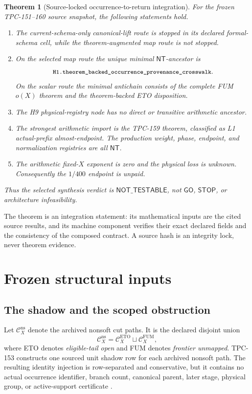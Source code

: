 \documentclass[11pt]{article}
\newtheorem{theorem}{Theorem}[section]
\theoremstyle{definition}
\newcommand{\NT}{\mathsf{NT}}
\newcommand{\code}[1]{\texttt{\small #1}}
\begin{document}
\begin{theorem}[Source-locked occurrence-to-return integration]
\label{thm:integration}
For the frozen TPC-151--160 source snapshot, the following statements
hold.
\begin{enumerate}[label=\textup{(\roman*)},leftmargin=2.2em]
  \item The current-schema-only canonical-lift route is stopped in its
  declared formal-schema cell, while the theorem-augmented map route
  is not stopped.
  \item On the selected map route the unique minimal
  \(\NT\)-ancestor is
  \[
    \code{H1.theorem\_backed\_occurrence\_provenance\_crosswalk}.
  \]
  On the scalar route the minimal antichain consists of the complete
  FUM \(o(X)\) theorem and the theorem-backed ETO disposition.
  \item The H9 physical-registry node has no direct or transitive
  arithmetic ancestor.
  \item The strongest arithmetic import is the TPC-159 theorem,
  classified as L1 actual-prefix almost-endpoint.  The production
  weight, phase, endpoint, and normalization registries are all
  \(\NT\).
  \item The arithmetic fixed-\(X\) exponent is zero and the physical
  loss is unknown.  Consequently the \(1/400\) endpoint is unpaid.
\end{enumerate}
Thus the selected synthesis verdict is
\(\mathsf{NOT\_TESTABLE}\), not \(\mathsf{GO}\),
\(\mathsf{STOP}\), or architecture infeasibility.
\end{theorem}

The theorem is an integration statement: its mathematical inputs are
the cited source results, and its machine component verifies their
exact declared fields and the consistency of the composed contract.
A source hash is an integrity lock, never theorem evidence.

\section{Frozen structural inputs}

\subsection{The shadow and the scoped obstruction}

Let \(\mathcal C_X^{\mathrm{ns}}\) denote the archived nonsoft cut
paths.  It is the declared disjoint union
\[
  \mathcal C_X^{\mathrm{ns}}
  =\mathcal C_X^{\mathrm{ETO}}\sqcup
   \mathcal C_X^{\mathrm{FUM}},
\]
where ETO denotes \emph{eligible-tail open} and FUM denotes
\emph{frontier unmapped}.  TPC-153 constructs one sourced unit shadow
row for each archived nonsoft path.  The resulting identity injection
is row-separated and conservative, but it contains no actual
occurrence identifier, branch count, canonical parent, later stage,
physical group, or active-support certificate \cite{WangTPC153}.
\end{document}
